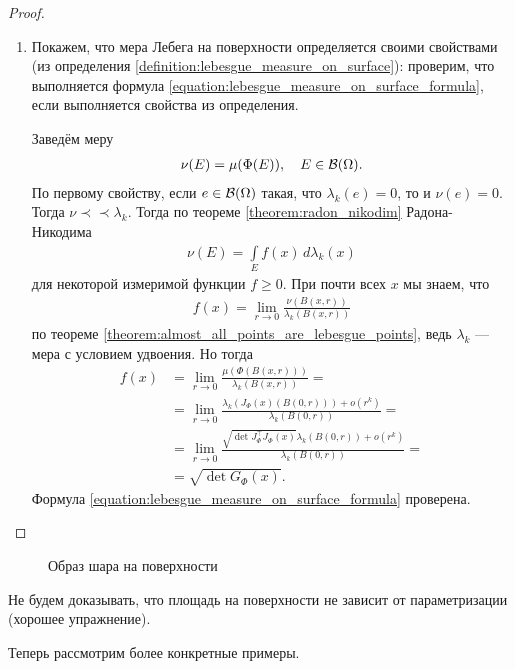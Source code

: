 \begin{proof}
\begin{enumerate}
 \item Покажем, что мера Лебега на поверхности определяется своими свойствами (из определения \ref{definition:lebesgue_measure_on_surface}): проверим, что выполняется формула \eqref{equation:lebesgue_measure_on_surface_formula}, если выполняется свойства из определения. 

  Заведём меру
  \begin{align*}
   \nu(E) = \mu(\Phi(E)), \quad E \in \mathcal{B}(\Omega)
  .\end{align*} По первому свойству, если $e \in \mathcal{B}(\Omega)$  такая, что $\lambda_k(e) = 0$, то и  $\nu(e) = 0$.  Тогда $\nu \prec \prec \lambda_k$. Тогда по теореме \ref{theorem:radon_nikodim} Радона-Никодима
  \begin{align*}
   \nu(E) = \int\limits_{E} f(x) \, d\lambda_k(x)  
  \end{align*} для некоторой измеримой функции $f \geqslant 0$. При почти всех $x$ мы знаем, что \begin{align*}
  f(x) = \lim_{r \to 0} \frac{\nu(B(x,r))}{\lambda_k(B(x,r))}
 \end{align*} по теореме \ref{theorem:almost_all_points_are_lebesgue_points}, ведь $\lambda_k$ --- мера с условием удвоения. Но тогда
 \begin{align*}
  f(x) &= \lim_{r \to 0}  \frac{\mu(\Phi(B(x,r)))}{\lambda_k(B(x,r))} = \\
  &= \lim_{r \to 0}  \frac{\lambda_k(J_{\Phi}(x)(B(0,r))) + o(r^{k})}{\lambda_k(B(0,r))} = \\
  &= \lim_{r \to 0} \frac{\sqrt{\det J_{\Phi}^{\top}J_{\Phi}(x)} \lambda_k(B(0,r)) + o(r^{k})}{\lambda_k(B(0,r))} = \\
  &= \sqrt{\det G_{\Phi}(x)}
 .\end{align*}  Формула \eqref{equation:lebesgue_measure_on_surface_formula} проверена.
\end{enumerate}
\end{proof}

\begin{figure}[ht]
    \centering
    \caption{Образ шара на поверхности}
    \label{fig:ball_image_on_surface}
\end{figure}

\begin{remrk*}
 Не будем доказывать, что площадь на поверхности не зависит от параметризации (хорошее упражнение).
\end{remrk*}

Теперь рассмотрим более конкретные примеры.

